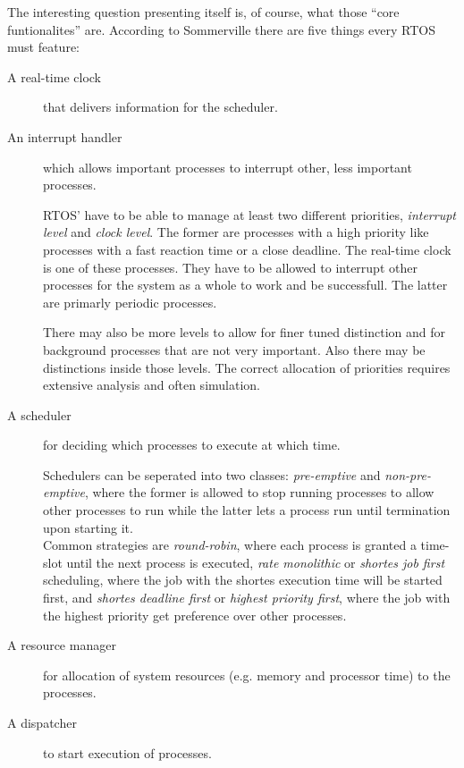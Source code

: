 \documentclass[10pt,a4paper,titlepage,draft]{article} %
\begin{document}
The interesting question presenting itself is, of course, what those ``core funtionalites'' are.
According to Sommerville there are five things every RTOS must feature:
\begin{description}
	\item[A real-time clock] that delivers information for the scheduler.
	\item[An interrupt handler] which allows important processes to interrupt other, less important processes.

	RTOS' have to be able to manage at least two different priorities, \emph{interrupt level} and \emph{clock level}.
	The former are processes with a high priority like processes with a fast reaction time or a close deadline.
	The real-time clock is one of these processes.
	They have to be allowed to interrupt other processes for the system as a whole to work and be successfull.
	The latter are primarly periodic processes.

	There may also be more levels to allow for finer tuned distinction and for background processes that are not very important. Also there may be distinctions inside those levels. The correct allocation of priorities requires extensive analysis and often simulation.
	\item[A scheduler] for deciding which processes to execute at which time.

	Schedulers can be seperated into two classes: \emph{pre-emptive} and \emph{non-pre-emptive}, where the former is allowed to stop running processes to allow other processes to run while the latter lets a process run until termination upon starting it.\\
	Common strategies are \emph{round-robin}, where each process is granted a time-slot until the next process is executed, \emph{rate monolithic} or \emph{shortes job first} scheduling, where the job with the shortes execution time will be started first, and \emph{shortes deadline first} or \emph{highest priority first}, where the job with the highest priority get preference over other processes.
	\item[A resource manager] for allocation of system resources (e.g. memory and processor time) to the processes.
	\item[A dispatcher] to start execution of processes.
\end{description}

\end{document}
